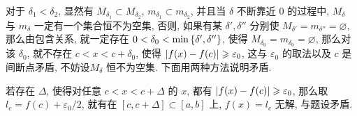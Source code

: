 \documentclass{ctexart}
\begin{document}
\begin{exercise}[series=exer]
\begin{answer}
        对于 $ \delta_{1} < \delta_{2} $, 显然有 $ M_{\delta_{1}} \subset M_{\delta_{2}} $, $ m_{\delta_{1}} \subset m_{\delta_{2}} $, 并且当 $ \delta $ 不断靠近 $ 0 $ 的过程中, $ M_{\delta} $ 与 $ m_{\delta} $ 一定有一个集合恒不为空集, 否则, 如果有某 $ \delta', \delta'' $ 分别使 $ M_{\delta'} = m_{\delta''} = \varnothing $, 那么由包含关系, 就一定存在 $ 0 < \delta_{0} < \min\qty{\delta', \delta''} $, 使得 $ M_{\delta_{0}} = m_{\delta_{0}} = \varnothing $, 那么对该 $ \delta_{0} $, 就不存在 $ c < x < c + \delta_{0} $, 使得 $ \abs{f(x) - f(c)} \geqslant \varepsilon_{0} $, 这与 $ \varepsilon_{0} $ 的取法以及 $ c $ 是间断点矛盾, 不妨设$ M_{\delta} $ 恒不为空集. 下面用两种方法说明矛盾. 
        \begin{method}
            \item 若存在 $ \Delta $, 使得对任意 $ c < x < c + \Delta $ 的 $ x $, 都有 $ \abs{f(x) - f(c)} \geqslant \varepsilon_{0} $, 那么取 $ l_{c} = f(c) + \varepsilon_{0}/2 $, 就有在 $ [c, c + \Delta] \subset [a, b] $ 上, $ f(x) = l_{c} $ 无解, 与题设矛盾. 


\end{method}
\end{answer}
\end{exercise}
\end{document}
